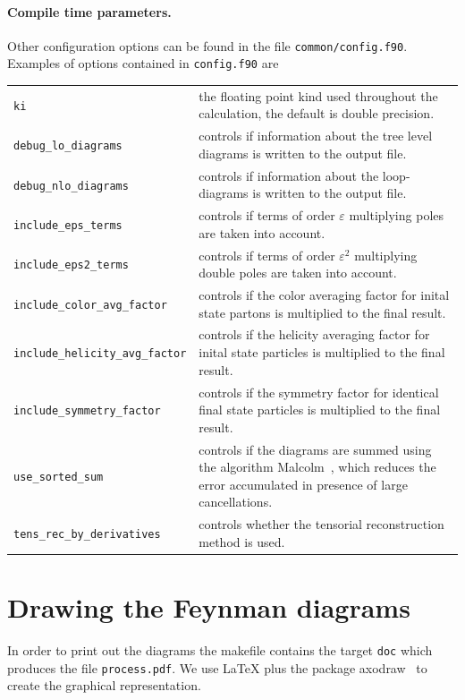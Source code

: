 \documentclass[11pt,a4paper]{refrep}
\begin{document}
\paragraph{Compile time parameters.}
Other configuration options can be found in the file \texttt{common/config.f90}.
\smallskip
Examples of options contained in \texttt{config.f90} are
\begin{maxipage}
\begin{tabular}{lp{}}
\texttt{ki} & the floating point kind used throughout the calculation, the default is double precision.\\
\texttt{debug\_lo\_diagrams} & controls if information about the
    tree level diagrams is written to the output file.\\
\texttt{debug\_nlo\_diagrams} & controls if information about the
    loop-diagrams is written to the output file.\\
\texttt{include\_eps\_terms} & controls if
    terms of order $\varepsilon$ multiplying
    poles are taken into account.\\
\texttt{include\_eps2\_terms} & controls if
    terms of order $\varepsilon^2$ multiplying
    double poles are taken into account.\\
\texttt{include\_color\_avg\_factor} & controls if the color averaging
    factor for inital state partons is multiplied to the final result.\\
\texttt{include\_helicity\_avg\_factor} & controls if the helicity averaging
    factor for inital state particles is multiplied to the final result.\\
\texttt{include\_symmetry\_factor} & controls if the symmetry
    factor for identical final state particles
    is multiplied to the final result. \\
\texttt{use\_sorted\_sum} & controls if the diagrams are summed using
    the algorithm Malcolm~\cite{Malcolm:1970}, which reduces the error
    accumulated in presence of large cancellations.\\
\texttt{tens\_rec\_by\_derivatives} & controls whether the tensorial reconstruction method is used.
\end{tabular}
\end{maxipage}

\section{Drawing the Feynman diagrams}
In order to print out the diagrams the makefile contains the target
\texttt{doc} which produces the file \texttt{process.pdf}.
We use \LaTeX{} plus the package \textsf{axodraw}~\cite{Vermaseren:1994je}
to create the graphical representation.
\end{document}
